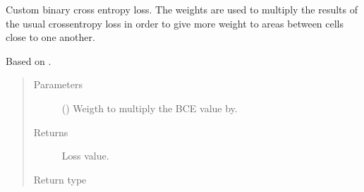 \documentclass[letterpaper,10pt,english]{sphinxmanual}
\begin{document}
\begin{fulllineitems}
\label{\detokenize{engine/metrics:engine.metrics.binary_crossentropy_weighted}}
Custom binary cross entropy loss. The weights are used to multiply the results of the usual cross\sphinxhyphen{}entropy loss
in order to give more weight to areas between cells close to one another.

Based on .
\begin{quote}\begin{description}
\item[{Parameters}] \leavevmode
{} () \textendash{} Weigth to multiply the BCE value by.

\item[{Returns}] \leavevmode
{} \textendash{} Loss value.

\item[{Return type}] \leavevmode
{}

\end{description}\end{quote}

\end{fulllineitems}

\end{document}
